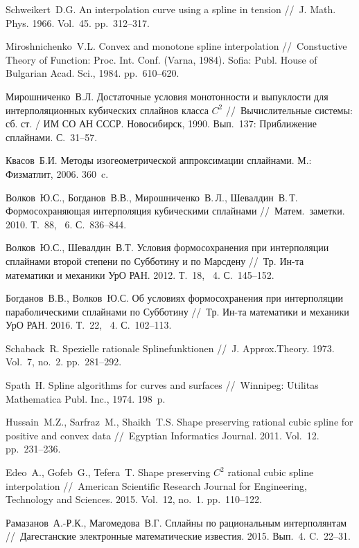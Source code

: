 \begin{thebibliography}{111}

Schweikert~D.G. An interpolation curve using a spline in tension
//~J. Math. Phys. 1966. Vol.~45. pp.~312--317.


Miroshnichenko~V.L. Convex and monotone spline interpolation
//~Constuctive Theory of Function: Proc. Int. Conf. (Varna, 1984).  Sofia:
Publ. House of Bulgarian Acad. Sci., 1984. pp.~610--620.

Мирошниченко~В.Л. Достаточные условия монотонности и выпуклости
для интерполяционных кубических сплайнов класса $C^2$
//~Вычислительные системы: сб. ст. / ИМ СО АН СССР.
Новосибирск, 1990. Вып.~137: Приближение сплайнами. С.~31--57.

Квасов~Б.И. Методы изогеометрической аппроксимации сплайнами.
 М.: Физматлит, 2006. 360~c.

Волков~Ю.С., Богданов~В.В., Мирошниченко~В.\,Л., Шевалдин~В.\,Т.
Формосохраняющая интерполяция кубическими сплайнами //~Матем.~заметки. 2010. Т.~88, \No~6. С.~836--844.

Волков~Ю.С., Шевалдин~В.Т.
Условия формосохранения при интерполяции сплайнами второй степени по Субботину и по Марсдену
//~Тр. Ин-та математики и механики УрО РАН. 2012. Т.~18, \No~4. С.~145--152.

Богданов~В.В., Волков~Ю.С.
Об условиях формосохранения при интерполяции параболическими сплайнами по Субботину
//~Тр. Ин-та математики и механики УрО РАН. 2016. Т.~22, \No~4. С.~102--113.

Schaback~R. Spezielle rationale Splinefunktionen
//~J. Approx.Theory.  1973. Vol.~7, no.~2. pp.~281--292.

Spath~H. Spline algorithms for curves and surfaces
//~Winnipeg: Utilitas Mathematica Publ. Inc., 1974. 198~p.

Hussain~M.Z., Sarfraz~M., Shaikh~T.S.
Shape preserving rational cubic spline for positive and convex data
//~Egyptian Informatics Journal. 2011. Vol.~12. pp.~231--236.

Edeo~A., Gofeb~G., Tefera~T. Shape preserving $C^2$ rational
 cubic spline interpolation //~American Scientific Research Journal for Engineering, Technology and Sciences.
 2015. Vol.~12, no.~1. pp.~110--122.

Рамазанов~А.-Р.К., Магомедова~В.Г.  Сплайны по рациональным интерполянтам
//~Дагестанские электронные математические известия. 2015. Вып.~4. C.~22--31.



\end{thebibliography}
